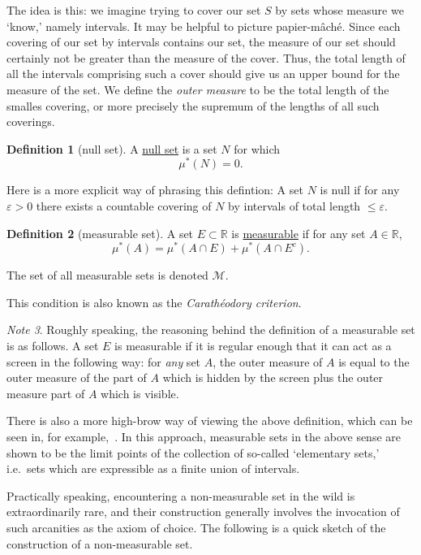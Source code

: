 \documentclass[a4paper,12pt]{scrreprt}
\newcommand{\R}{\mathbb{R}}
\newcommand{\defn}[1]{\ul{#1}}
\theoremstyle{definition}
\newtheorem{definition}{Definition}
\theoremstyle{plain}
\theoremstyle{remark}
\newtheorem{note}[definition]{Note}
\begin{document}
The idea is this: we imagine trying to cover our set $S$ by sets whose measure we `know,' namely intervals. It may be helpful to picture papier-m\^{a}ch\'{e}. Since each covering of our set by intervals contains our set, the measure of our set should certainly not be greater than the measure of the cover. Thus, the total length of all the intervals comprising such a cover should give us an upper bound for the measure of the set. We define the \emph{outer measure} to be the total length of the smalles covering, or more precisely the supremum of the lengths of all such coverings.

\begin{definition}[null set]
  \label{def:nullset}
  A \defn{null set} is a set $N$ for which
  \begin{equation*}
    \mu^{*}(N) = 0.
  \end{equation*}

  Here is a more explicit way of phrasing this defintion: A set $N$ is null if for any $\varepsilon > 0$ there exists a countable covering of $N$ by intervals of total length $\leq \varepsilon$.
\end{definition}

\begin{definition}[measurable set]
  \label{def:measurableset}
  A set $E \subset \R$ is \defn{measurable} if for any set $A \in \R$,
  \begin{equation*}
    \mu^{*}(A) = \mu^{*}(A \cap E) + \mu^{*} (A \cap E^{c}).
  \end{equation*}

  The set of all measurable sets is denoted $\mathcal{M}$.

  This condition is also known as the \emph{Carath\'{e}odory criterion}.
\end{definition}

\begin{note}
  Roughly speaking, the reasoning behind the definition of a measurable set is as follows. A set $E$ is measurable if it is regular enough that it can act as a screen in the following way: for \emph{any} set $A$, the outer measure of $A$ is equal to the outer measure of the part of $A$ which is hidden by the screen plus the outer measure part of $A$ which is visible.

  There is also a more high-brow way of viewing the above definition, which can be seen in, for example,~\cite{measurablesetsarelimitpoints}. In this approach, measurable sets in the above sense are shown to be the limit points of the collection of so-called `elementary sets,' i.e.\ sets which are expressible as a finite union of intervals.

  Practically speaking, encountering a non-measurable set in the wild is extraordinarily rare, and their construction generally involves the invocation of such arcanities as the axiom of choice. The following is a quick sketch of the construction of a non-measurable set.
\end{note}
\end{document}
